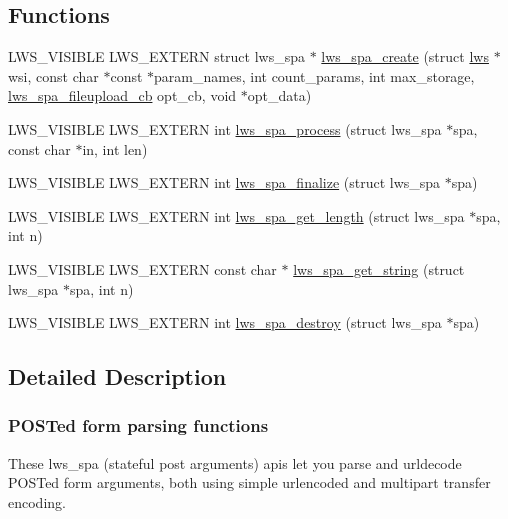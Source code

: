 \subsection*{Functions}
\begin{DoxyCompactItemize}
\item 
L\+W\+S\+\_\+\+V\+I\+S\+I\+B\+LE L\+W\+S\+\_\+\+E\+X\+T\+E\+RN struct lws\+\_\+spa $\ast$ \hyperlink{group__form-parsing_gaacb1217231c8615cf65f36e70dff90ed}{lws\+\_\+spa\+\_\+create} (struct \hyperlink{structlws}{lws} $\ast$wsi, const char $\ast$const $\ast$param\+\_\+names, int count\+\_\+params, int max\+\_\+storage, \hyperlink{group__form-parsing_ga5a70527c0861c2ffa3d29333a6aa7f8e}{lws\+\_\+spa\+\_\+fileupload\+\_\+cb} opt\+\_\+cb, void $\ast$opt\+\_\+data)
\item 
L\+W\+S\+\_\+\+V\+I\+S\+I\+B\+LE L\+W\+S\+\_\+\+E\+X\+T\+E\+RN int \hyperlink{group__form-parsing_ga9ad9ebf5ea1a7108415ed7e04cb231d2}{lws\+\_\+spa\+\_\+process} (struct lws\+\_\+spa $\ast$spa, const char $\ast$in, int len)
\item 
L\+W\+S\+\_\+\+V\+I\+S\+I\+B\+LE L\+W\+S\+\_\+\+E\+X\+T\+E\+RN int \hyperlink{group__form-parsing_ga83835bf250ee3d4a60f36a182f2b8d24}{lws\+\_\+spa\+\_\+finalize} (struct lws\+\_\+spa $\ast$spa)
\item 
L\+W\+S\+\_\+\+V\+I\+S\+I\+B\+LE L\+W\+S\+\_\+\+E\+X\+T\+E\+RN int \hyperlink{group__form-parsing_ga3fbe378632f85ec9a14cc2c1687bf05f}{lws\+\_\+spa\+\_\+get\+\_\+length} (struct lws\+\_\+spa $\ast$spa, int n)
\item 
L\+W\+S\+\_\+\+V\+I\+S\+I\+B\+LE L\+W\+S\+\_\+\+E\+X\+T\+E\+RN const char $\ast$ \hyperlink{group__form-parsing_ga00907a35dcf7f97b16cf961cece6a6fa}{lws\+\_\+spa\+\_\+get\+\_\+string} (struct lws\+\_\+spa $\ast$spa, int n)
\item 
L\+W\+S\+\_\+\+V\+I\+S\+I\+B\+LE L\+W\+S\+\_\+\+E\+X\+T\+E\+RN int \hyperlink{group__form-parsing_gaaa482f07dad3f04b391cccf0a814e13b}{lws\+\_\+spa\+\_\+destroy} (struct lws\+\_\+spa $\ast$spa)
\end{DoxyCompactItemize}


\subsection{Detailed Description}
\subsubsection*{P\+O\+S\+Ted form parsing functions}

These lws\+\_\+spa (stateful post arguments) apis let you parse and urldecode P\+O\+S\+Ted form arguments, both using simple urlencoded and multipart transfer encoding.

